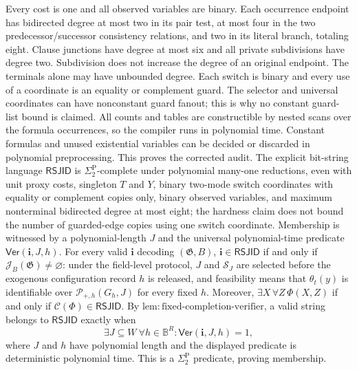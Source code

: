 Every cost is one and all observed variables are binary.  Each occurrence endpoint has bidirected degree at most two in its pair test, at most four in the two predecessor/successor consistency relations, and two in its literal branch, totaling eight.  Clause junctions have degree at most six and all private subdivisions have degree two.  Subdivision does not increase the degree of an original endpoint.  The terminals alone may have unbounded degree.  Each switch is binary and every use of a coordinate is an equality or complement guard.  The selector and universal coordinates can have nonconstant guard fanout; this is why no constant guard-list bound is claimed.  All counts and tables are constructible by nested scans over the formula occurrences, so the compiler runs in polynomial time.  Constant formulas and unused existential variables can be decided or discarded in polynomial preprocessing.  This proves the corrected audit.
The explicit bit-string language \(\mathsf{RSJID}\) is \(\Sigma_2^{\mathrm P}\)-complete under polynomial many-one reductions, even with unit proxy costs, singleton \(T\) and \(Y\), binary two-mode switch coordinates with equality or complement copies only, binary observed variables, and maximum nonterminal bidirected degree at most eight; the hardness claim does not bound the number of guarded-edge copies using one switch coordinate. Membership is witnessed by a polynomial-length \(J\) and the universal polynomial-time predicate \(\mathsf{Ver}(\mathbf i,J,h)\). For every valid \(\mathbf i\) decoding \((\mathfrak G,B)\), \(\mathbf i\in\mathsf{RSJID}\) if and only if \(\mathcal J_B(\mathfrak G)\ne\varnothing\): under the field-level protocol, \(J\) and \(\mathcal S_J\) are selected before the exogenous configuration record \(h\) is released, and feasibility means that \(\theta_t(y)\) is identifiable over \(\mathcal P_{+,h}(G_h,J)\) for every fixed \(h\). Moreover, \(\exists X\,\forall Z\,\Phi(X,Z)\) if and only if \(\mathcal C(\Phi)\in\mathsf{RSJID}\).
By \(\mathrm{lem{:}fixed\text{-}completion\text{-}verifier}\), a valid string belongs to \(\mathsf{RSJID}\) exactly when
\[
 \exists J\subseteq W\ \forall h\in\mathbb B^R:
 \mathsf{Ver}(\mathbf i,J,h)=1,
\]
where \(J\) and \(h\) have polynomial length and the displayed predicate is deterministic polynomial time.  This is a \(\Sigma_2^{\mathrm P}\) predicate, proving membership.

